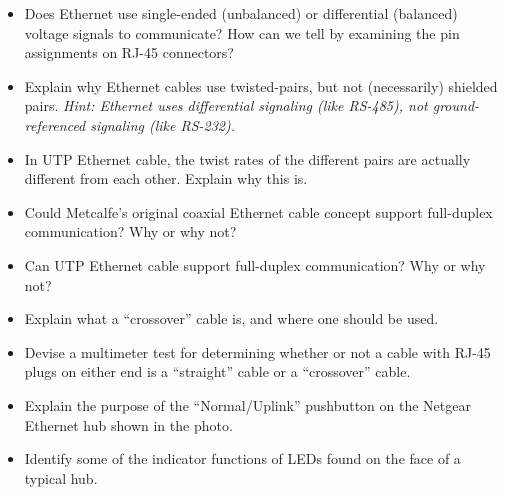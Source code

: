 \begin{itemize}
\item{} Does Ethernet use single-ended (unbalanced) or differential (balanced) voltage signals to communicate?  How can we tell by examining the pin assignments on RJ-45 connectors?
\item{} Explain why Ethernet cables use twisted-pairs, but not (necessarily) shielded pairs.  {\it Hint: Ethernet uses differential signaling (like RS-485), not ground-referenced signaling (like RS-232).}
\item{} In UTP Ethernet cable, the twist rates of the different pairs are actually different from each other.  Explain why this is.
\item{} Could Metcalfe's original coaxial Ethernet cable concept support full-duplex communication?  Why or why not?
\item{} Can UTP Ethernet cable support full-duplex communication?  Why or why not?
\item{} Explain what a ``crossover'' cable is, and where one should be used.
\item{} Devise a multimeter test for determining whether or not a cable with RJ-45 plugs on either end is a ``straight'' cable or a ``crossover'' cable.
\item{} Explain the purpose of the ``Normal/Uplink'' pushbutton on the Netgear Ethernet hub shown in the photo.
\item{} Identify some of the indicator functions of LEDs found on the face of a typical hub.
\end{itemize}



